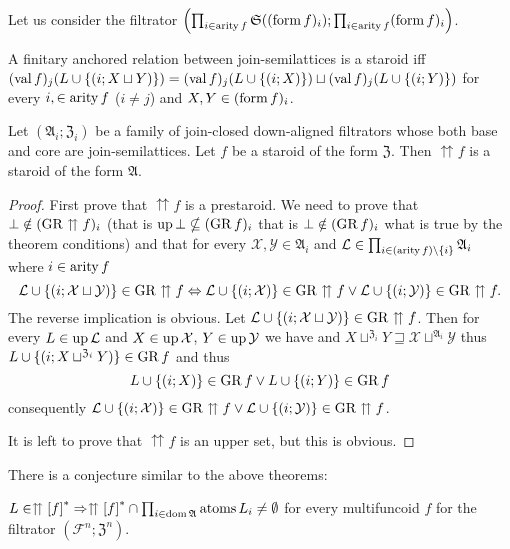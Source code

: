 Let us consider the filtrator $\left(\prod_{i\in\operatorname{arity} f}\mathfrak{S}((\operatorname{form} f)_{i});\prod_{i\in\operatorname{arity} f}(\operatorname{form} f)_{i}\right)$.
\begin{conjecture}
A finitary anchored relation between join-semilattices is a staroid
iff $(\operatorname{val} f)_{j}(L\cup\{(i;X\sqcup Y)\})=(\operatorname{val} f)_{j}(L\cup\{(i;X)\})\sqcup(\operatorname{val} f)_{j}(L\cup\{(i;Y)\})$
for every $i,\in\operatorname{arity} f$ ($i\ne j$) and $X,Y\in(\operatorname{form} f)_{i}$.\end{conjecture}
\begin{thm}
\label{upg-is-strd}Let $(\mathfrak{A}_{i};\mathfrak{Z}_{i})$ be
a family of join-closed down-aligned filtrators whose both base and
core are join-semilattices. Let $f$ be a staroid of the form $\mathfrak{Z}$.
Then $\upuparrows f$ is a staroid of the form $\mathfrak{A}$.\end{thm}
\begin{proof}
First prove that $\upuparrows f$ is a prestaroid. We need to prove
that $\bot\notin(\operatorname{GR}\upuparrows f)_{i}$ (that is $\operatorname{up}\bot\nsubseteq(\operatorname{GR} f)_{i}$
that is $\bot\notin(\operatorname{GR} f)_{i}$ what is true by the theorem conditions)
and that for every $\mathcal{X},\mathcal{Y}\in\mathfrak{A}_{i}$ and
$\mathcal{L}\in\prod_{i\in(\operatorname{arity} f)\setminus\{i\}}\mathfrak{A}_{i}$
where $i\in\operatorname{arity} f$
\[
\mathcal{L}\cup\{(i;\mathcal{X}\sqcup\mathcal{Y})\}\in\operatorname{GR}\upuparrows f\Leftrightarrow\mathcal{L}\cup\{(i;\mathcal{X})\}\in\operatorname{GR}\upuparrows f\vee\mathcal{L}\cup\{(i;\mathcal{Y})\}\in\operatorname{GR}\upuparrows f.
\]
The reverse implication is obvious. Let $\mathcal{L}\cup\{(i;\mathcal{X}\sqcup\mathcal{Y})\}\in\operatorname{GR}\upuparrows f$.
Then for every $L\in\operatorname{up}\mathcal{L}$ and $X\in\operatorname{up}\mathcal{X}$, $Y\in\operatorname{up}\mathcal{Y}$
we have and $X\sqcup^{\mathfrak{Z}_{i}}Y\sqsupseteq\mathcal{X}\sqcup^{\mathfrak{A}_{i}}\mathcal{Y}$
thus $L\cup\{(i;X\sqcup^{\mathfrak{Z}_{i}}Y)\}\in\operatorname{GR} f$ and thus
\[
L\cup\{(i;X)\}\in\operatorname{GR} f\vee L\cup\{(i;Y)\}\in\operatorname{GR} f
\]
consequently $\mathcal{L}\cup\{(i;\mathcal{X})\}\in\operatorname{GR}\upuparrows f\vee\mathcal{L}\cup\{(i;\mathcal{Y})\}\in\operatorname{GR}\upuparrows f$.

It is left to prove that $\upuparrows f$ is an upper set, but this
is obvious.
\end{proof}
There is a conjecture similar to the above theorems:
\begin{conjecture}
\label{strd-rel-atoms}$L\in\upuparrows\mathord{\mathrel{\left[f\right]^{\ast}}}\Rightarrow\upuparrows\mathord{\mathrel{\left[f\right]^{\ast}}}\cap\prod_{i\in\operatorname{dom}\mathfrak{A}}\operatorname{atoms} L_{i}\neq\emptyset$
for every multifuncoid $f$ for the filtrator $(\mathscr{F}^{n};\mathfrak{Z}^{n})$.
\end{conjecture}

